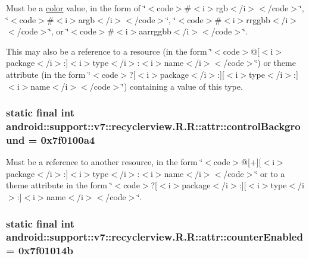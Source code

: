 Must be a \hyperlink{classandroid_1_1support_1_1v7_1_1recyclerview_1_1_r_1_1color}{color} value, in the form of \char`\"{}$<$code$>$\#$<$i$>$rgb$<$/i$>$$<$/code$>$\char`\"{}, \char`\"{}$<$code$>$\#$<$i$>$argb$<$/i$>$$<$/code$>$\char`\"{}, \char`\"{}$<$code$>$\#$<$i$>$rrggbb$<$/i$>$$<$/code$>$\char`\"{}, or \char`\"{}$<$code$>$\#$<$i$>$aarrggbb$<$/i$>$$<$/code$>$\char`\"{}. 

This may also be a reference to a resource (in the form \char`\"{}$<$code$>$@\mbox{[}$<$i$>$package$<$/i$>$:\mbox{]}$<$i$>$type$<$/i$>$:$<$i$>$name$<$/i$>$$<$/code$>$\char`\"{}) or theme attribute (in the form \char`\"{}$<$code$>$?\mbox{[}$<$i$>$package$<$/i$>$:\mbox{]}\mbox{[}$<$i$>$type$<$/i$>$:\mbox{]}$<$i$>$name$<$/i$>$$<$/code$>$\char`\"{}) containing a value of this type. \hypertarget{classandroid_1_1support_1_1v7_1_1recyclerview_1_1_r_1_1attr_586ec30907031b874a8c7c055cbf440e}{
\subsubsection[{controlBackground}]{\setlength{\rightskip}{0pt plus 5cm}static final int android::support::v7::recyclerview.R.R::attr::controlBackground = 0x7f0100a4}}
\label{classandroid_1_1support_1_1v7_1_1recyclerview_1_1_r_1_1attr_586ec30907031b874a8c7c055cbf440e}


Must be a reference to another resource, in the form \char`\"{}$<$code$>$@\mbox{[}+\mbox{]}\mbox{[}$<$i$>$package$<$/i$>$:\mbox{]}$<$i$>$type$<$/i$>$:$<$i$>$name$<$/i$>$$<$/code$>$\char`\"{} or to a theme attribute in the form \char`\"{}$<$code$>$?\mbox{[}$<$i$>$package$<$/i$>$:\mbox{]}\mbox{[}$<$i$>$type$<$/i$>$:\mbox{]}$<$i$>$name$<$/i$>$$<$/code$>$\char`\"{}. \hypertarget{classandroid_1_1support_1_1v7_1_1recyclerview_1_1_r_1_1attr_7551331f9abc2573d8863e9851b8962c}{
\subsubsection[{counterEnabled}]{\setlength{\rightskip}{0pt plus 5cm}static final int android::support::v7::recyclerview.R.R::attr::counterEnabled = 0x7f01014b}}
\label{classandroid_1_1support_1_1v7_1_1recyclerview_1_1_r_1_1attr_7551331f9abc2573d8863e9851b8962c}


